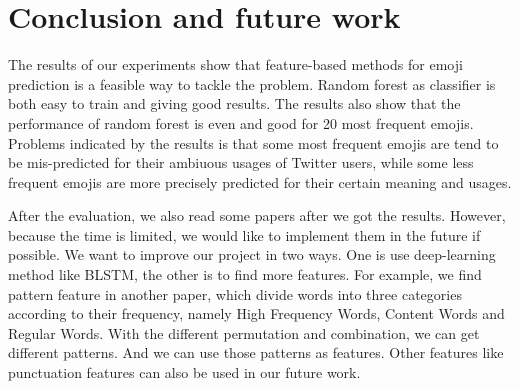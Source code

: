\documentclass[english, table, latin9]{article}
\begin{document}
\section{Conclusion and future work}
\label{sc5}
The results of our experiments show that feature-based methods for emoji prediction is a feasible way to tackle the problem. Random forest as classifier is both easy to train and giving good results. The results also show that the performance of random forest is even and good for 20 most frequent emojis. Problems indicated by the results is that some most frequent emojis are tend to be mis-predicted for their ambiuous usages of Twitter users, while some less frequent emojis are more precisely predicted for their certain meaning and usages.

After the evaluation, we also read some papers after we got the results. However, because the time is limited, we would like to implement them in the future if possible. We want to improve our project in two ways. One is use deep-learning method like BLSTM\cite{bib4}, the other is to find more features. For example, we find pattern feature in another paper\cite{bib3}, which divide words into three categories according to their frequency, namely High Frequency Words, Content Words and Regular Words. With the different permutation and combination, we can get different patterns. And we can use those patterns as features. Other features like punctuation features can also be used in our future work.
\end{document}
